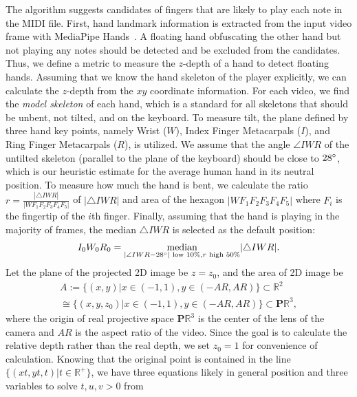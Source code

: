\documentclass{article}
\begin{document}
The algorithm suggests candidates of fingers that are likely to play each note in the MIDI file. First, hand landmark information is extracted from the input video frame with MediaPipe Hands~\cite{arXiv20Zhang}. A floating hand obfuscating the other hand but not playing any notes should be detected and be excluded from the candidates. Thus, we define a metric to measure the $z$-depth of a hand to detect floating hands. Assuming that we know the hand skeleton of the player explicitly, we can calculate the $z$-depth from the $xy$ coordinate information. For each video, we find the \textit{model skeleton} of each hand, which is a standard for all skeletons that should be unbent, not tilted, and on the keyboard. To measure tilt, the plane defined by three hand key points, namely Wrist ($W$), Index Finger Metacarpals ($I$), and Ring Finger Metacarpals ($R$), is utilized. We assume that the angle $\angle IWR$ of the untilted skeleton (parallel to the plane of the keyboard) should be close to $28\degree$, which is our heuristic estimate for the average human hand in its neutral position. To measure how much the hand is bent, we calculate the ratio $r=\frac{|\triangle IWR|}{|WF_{1}F_{2}F_{3}F_{4}F_{5}|}$ of $|\triangle IWR|$ and area of the hexagon $|WF_{1}F_{2}F_{3}F_{4}F_{5}|$ where $F_i$ is the fingertip of the $i$th finger. Finally, assuming that the hand is playing in the majority of frames, the median $\triangle IWR$ is selected as the default position:
\begin{equation}
    I_{0}W_{0}R_{0}=\underset{|\angle IWR - 28\degree| \text{ low 10\%}, r \text{ high 50\%}}{\text{median}}|\triangle IWR| .
\end{equation}
Let the plane of the projected 2D image be $z=z_{0}$, and the area of 2D image be
\begin{equation}
  \begin{aligned}
    A:=\{(x,y)  | x\in (-1,1), y\in (-AR,AR)\} \subset \mathbb{R}^2
    \\\cong\{(x,y,z_{0})|x\in(-1,1), y\in (-AR,AR)\}\subset \mathbf{P}\mathbb{R}^3 ,
\end{aligned}  
\end{equation}
where the origin of real projective space $\mathbf{P}\mathbb{R}^3$ is the center of the lens of the camera and $AR$ is the aspect ratio of the video. Since the goal is to calculate the relative depth rather than the real depth, we set $z_{0}=1$ for convenience of calculation.
Knowing that the original point is contained in the line $\{(xt,yt,t) | t\in \mathbb{R^{+}}\}$, we have three equations likely in general position and three variables to solve $t,u,v>0$ from
\end{document}

